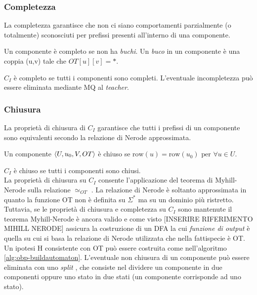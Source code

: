 \subsubsection{Completezza}
La completezza garantisce che non ci siano comportamenti parzialmente (o totalmente) sconosciuti per prefissi presenti all'interno di una componente.
\begin{definizione*} Un componente è completo se non ha \textit{buchi}. Un \textit{buco} in un componente è una coppia (u,v) tale che $OT[u][v] = *$.
\end{definizione*}
$C_I$ è completo se tutti i componenti sono completi.
L'eventuale incompletezza può essere eliminata mediante \ac{MQ} al \textit{teacher}.
\subsubsection{Chiusura}
La proprietà di chiusura di $C_I$ garantisce che tutti i prefissi di un componente sono equivalenti secondo la relazione di Nerode approssimata.

\begin{definizione*} Un componente $\Braket{U,u_0,V,OT}$ è chiuso se $\text{row}(u) = \text{row}(u_0) \text{ per } \forall u \in U$.
\end{definizione*}
$C_I$ è chiuso se tutti i componenti sono chiusi.\\

La proprietà di chiusura su $C_I$ consente l'applicazione del teorema di Myhill-Nerode sulla relazione $\simeq_{OT}$ . La relazione di Nerode è soltanto approssimata in quanto la funzione OT non è definita su $\Sigma^{*}$ ma su un dominio più ristretto. Tuttavia, se le proprietà di chiusura  e completezza  su $C_I$ sono mantenute il teorema Myhill-Nerode è ancora valido e come visto [INSERIRE RIFERIMENTO MIHILL NERODE] assicura la costruzione di un \ac{DFA} la cui \textit{funzione di output} è quella su cui si basa la relazione di Nerode utilizzata che nella fattispecie è OT. Un ipotesi \ac{H} consistente con OT può essere costruita come nell'algoritmo \ref{alg:obp-buildautomaton}. L'eventuale non chiusura di un componente può essere eliminata con uno \textit{split} , che consiste nel dividere un componente in due componenti oppure uno stato in due stati (un componente corrisponde ad uno stato).


